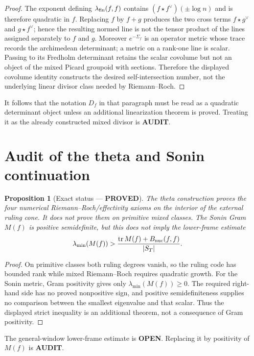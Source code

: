 \documentclass[11pt]{article}
\newcommand{\PROVED}{\textcolor{green!40!black}{\textbf{PROVED}}}
\newcommand{\OPEN}{\textcolor{red!70!black}{\textbf{OPEN}}}
\newcommand{\AUDIT}{\textcolor{orange!70!black}{\textbf{AUDIT}}}
\newtheorem{proposition}{Proposition}
\begin{document}
\begin{proof}
The exponent defining $\lambda_{\rm fin}(f,f)$ contains
$(f\star f^\vee)(\pm\log n)$ and is therefore quadratic in $f$.
Replacing $f$ by $f+g$ produces the two cross terms
$f\star g^\vee$ and $g\star f^\vee$; hence the resulting normed line is not
the tensor product of the lines assigned separately to $f$ and $g$.
Moreover $e^{-\Sigma_f}$ is an operator metric whose trace records the
archimedean determinant; a metric on a rank-one line is scalar.  Passing to
its Fredholm determinant retains the scalar covolume but not an object of the
mixed Picard groupoid with sections.  Therefore the displayed covolume
identity constructs the desired self-intersection number, not the underlying
linear divisor class needed by Riemann--Roch.
\end{proof}

It follows that the notation $D_f$ in that paragraph must be read as a
quadratic determinant object unless an additional linearization theorem is
proved.  Treating it as the already constructed mixed divisor is \AUDIT.

\section{Audit of the theta and Sonin continuation}

\begin{proposition}[Exact status --- \PROVED]
The theta construction proves the four numerical Riemann--Roch/effectivity
axioms on the interior of the external ruling cone.  It does not prove them
on primitive mixed classes.  The Sonin Gram $M(f)$ is positive semidefinite,
but this does not imply the lower-frame estimate
\[
 \lambda_{\min}(M(f))>
 \frac{\operatorname{tr}M(f)+B_{\rm nuc}(f,f)}{|S_T|}.
\]
\end{proposition}

\begin{proof}
On primitive classes both ruling degrees vanish, so the ruling code has
bounded rank while mixed Riemann--Roch requires quadratic growth.  For the
Sonin metric, Gram positivity gives only $\lambda_{\min}(M(f))\geq0$.
The required right-hand side has no proved nonpositive sign, and positive
semidefiniteness supplies no comparison between the smallest eigenvalue and
that scalar.  Thus the displayed strict inequality is an additional theorem,
not a consequence of Gram positivity.
\end{proof}

The general-window lower-frame estimate is \OPEN.  Replacing it by positivity
of $M(f)$ is \AUDIT.
\end{document}
